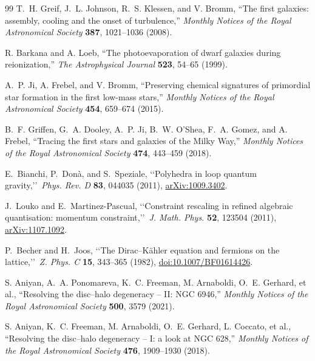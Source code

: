 \documentclass[11pt]{article}
\begin{document}
\begin{thebibliography}{99}
T.~H. Greif, J.~L. Johnson, R.~S. Klessen, and V. Bromm,
``The first galaxies: assembly, cooling and the onset of turbulence,''
\emph{Monthly Notices of the Royal Astronomical Society} \textbf{387},
1021--1036 (2008).

R. Barkana and A. Loeb,
``The photoevaporation of dwarf galaxies during reionization,''
\emph{The Astrophysical Journal} \textbf{523}, 54--65 (1999).

A.~P. Ji, A. Frebel, and V. Bromm,
``Preserving chemical signatures of primordial star formation in the first low-mass stars,''
\emph{Monthly Notices of the Royal Astronomical Society} \textbf{454},
659--674 (2015).

B.~F. Griffen, G.~A. Dooley, A.~P. Ji, B.~W. O'Shea, F.~A. Gomez, and A. Frebel,
``Tracing the first stars and galaxies of the Milky Way,''
\emph{Monthly Notices of the Royal Astronomical Society} \textbf{474},
443--459 (2018).

E.~Bianchi, P.~Don\`a, and S.~Speziale,
\lq\lq Polyhedra in loop quantum gravity,\rq\rq\
\emph{Phys. Rev. D} \textbf{83}, 044035 (2011),
\href{https://arxiv.org/abs/1009.3402}{arXiv:1009.3402}.

J.~Louko and E.~Martinez-Pascual,
\lq\lq Constraint rescaling in refined algebraic quantisation:
momentum constraint,\rq\rq\
\emph{J. Math. Phys.} \textbf{52}, 123504 (2011),
\href{https://arxiv.org/abs/1107.1092}{arXiv:1107.1092}.

P.~Becher and H.~Joos,
\lq\lq The Dirac--K\"ahler equation and fermions on the lattice,\rq\rq\
\emph{Z. Phys. C} \textbf{15}, 343--365 (1982),
\href{https://doi.org/10.1007/BF01614426}{doi:10.1007/BF01614426}.

\bibitem[Aniyan et al.(2021)]{Aniyan2021}
S. Aniyan, A.~A. Ponomareva, K.~C. Freeman, M. Arnaboldi, O.~E. Gerhard, et al.,
``Resolving the disc--halo degeneracy -- II: NGC 6946,''
\emph{Monthly Notices of the Royal Astronomical Society} \textbf{500}, 3579 (2021).

\bibitem[Aniyan et al.(2018)]{Aniyan2018}
S. Aniyan, K.~C. Freeman, M. Arnaboldi, O.~E. Gerhard, L. Coccato, et al.,
``Resolving the disc--halo degeneracy -- I: a look at NGC 628,''
\emph{Monthly Notices of the Royal Astronomical Society} \textbf{476}, 1909--1930 (2018).


\end{thebibliography}
\end{document}
